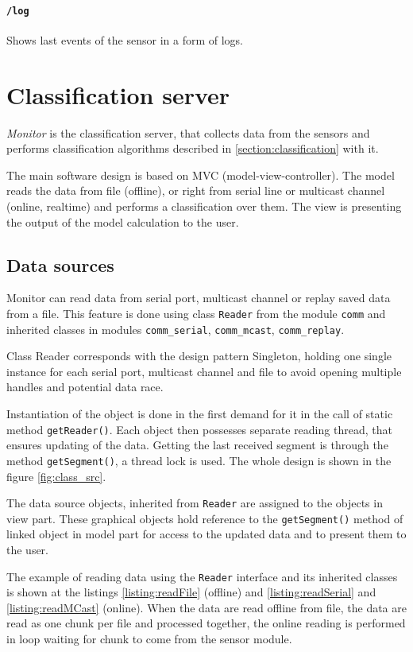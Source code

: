 \paragraph{\texttt{/log}}
Shows last events of the sensor in a form of logs.


\section{Classification server}
\label{chapter:serverImplementation}
{\it Monitor} is the classification server, that collects data from the sensors and performs
classification algorithms described in \ref{section:classification} with it.

The main software design is based on MVC (model-view-controller). The model reads the data from
file (offline), or right from serial line or multicast channel (online, realtime) and performs
a classification over them. The view is presenting the output of the model calculation to the user.

\subsection*{Data sources}
Monitor can read data from serial port, multicast channel or replay saved data from a file.
This feature is done using class \texttt{Reader} from the module \texttt{comm} and inherited classes
in modules \texttt{comm\_serial}, \texttt{comm\_mcast}, \texttt{comm\_replay}.

Class Reader corresponds with the design pattern Singleton, holding one single instance for each
serial port, multicast channel and file to avoid opening multiple handles and potential data race.

Instantiation of the object is done in the first demand for it in the call of static method \texttt{getReader()}.
Each object then possesses separate reading thread, that ensures updating of the data. Getting the last
received segment is through the method \texttt{getSegment()}, a thread lock is used. The whole design is shown
in the figure \ref{fig:class_src}.

The data source objects, inherited from \texttt{Reader} are assigned to the objects in view part. These graphical
objects hold reference to the \texttt{getSegment()} method of linked object in model part for access to the updated
data and to present them to the user.

The example of reading data using the \texttt{Reader} interface and its inherited classes is shown at the
listings \ref{listing:readFile} (offline) and  \ref{listing:readSerial} and \ref{listing:readMCast} (online).
When the data are read offline from file, the data are read as one chunk per file and processed together,
the online reading is performed in loop waiting for chunk to come from the sensor module.

